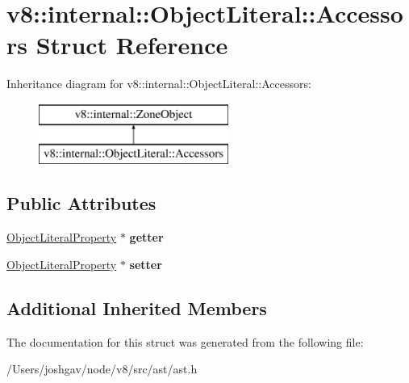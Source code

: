 \hypertarget{structv8_1_1internal_1_1_object_literal_1_1_accessors}{}\section{v8\+:\+:internal\+:\+:Object\+Literal\+:\+:Accessors Struct Reference}
\label{structv8_1_1internal_1_1_object_literal_1_1_accessors}
Inheritance diagram for v8\+:\+:internal\+:\+:Object\+Literal\+:\+:Accessors\+:\begin{figure}[H]
\begin{center}
\leavevmode
\includegraphics[height=2.000000cm]{structv8_1_1internal_1_1_object_literal_1_1_accessors}
\end{center}
\end{figure}
\subsection*{Public Attributes}
\begin{DoxyCompactItemize}
\item 
\hyperlink{classv8_1_1internal_1_1_object_literal_property}{Object\+Literal\+Property} $\ast$ {\bfseries getter}\hypertarget{structv8_1_1internal_1_1_object_literal_1_1_accessors_ad6206e1f4b41848f1b36116ae972da8c}{}\label{structv8_1_1internal_1_1_object_literal_1_1_accessors_ad6206e1f4b41848f1b36116ae972da8c}

\item 
\hyperlink{classv8_1_1internal_1_1_object_literal_property}{Object\+Literal\+Property} $\ast$ {\bfseries setter}\hypertarget{structv8_1_1internal_1_1_object_literal_1_1_accessors_a5d319b2c9b5e07d608c478e11c9e467e}{}\label{structv8_1_1internal_1_1_object_literal_1_1_accessors_a5d319b2c9b5e07d608c478e11c9e467e}

\end{DoxyCompactItemize}
\subsection*{Additional Inherited Members}


The documentation for this struct was generated from the following file\+:\begin{DoxyCompactItemize}
\item 
/\+Users/joshgav/node/v8/src/ast/ast.\+h\end{DoxyCompactItemize}
